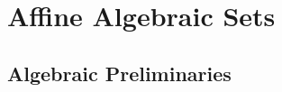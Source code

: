 \chapter{Affine Algebraic Sets}

\section{Algebraic Preliminaries}

\begin{exercise}
    \td
\end{exercise}

\begin{solution}
    \td \\
\end{solution}

\begin{exercise}
    \td
\end{exercise}

\begin{solution}
    \td \\
\end{solution}

\begin{exercise}
    \td
\end{exercise}

\begin{solution}
    \td \\
\end{solution}

\begin{exercise}
    \td
\end{exercise}

\begin{solution}
    \td \\
\end{solution}

\begin{exercise}
    \td
\end{exercise}

\begin{solution}
    \td \\
\end{solution}

\begin{exercise}
    \td
\end{exercise}

\begin{solution}
    \td \\
\end{solution}

